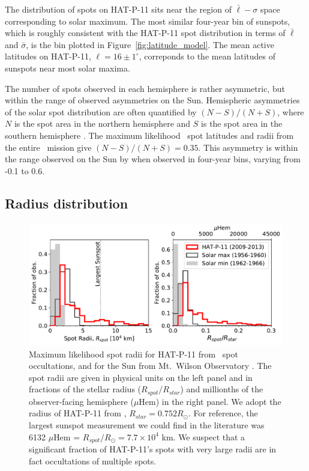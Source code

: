 The distribution of spots on HAT-P-11 sits near the region of $\bar{\ell} - \sigma$ space corresponding to solar maximum. The most similar four-year bin of sunspots, which is roughly consistent with the HAT-P-11 spot distribution in terms of $\bar{\ell}$ and $\bar{\sigma}$, is the bin plotted in Figure~\ref{fig:latitude_model}. The mean active latitudes on HAT-P-11, $\ell = 16 \pm 1^\circ$, correponds to the mean latitudes of sunspots near most solar maxima.

The number of spots observed in each hemisphere is rather asymmetric, but within the range of observed asymmetries on the Sun. Hemispheric asymmetries of the solar spot distribution are often quantified by $(N-S)/(N+S)$, where $N$ is the spot area in the northern hemisphere and $S$ is the spot area in the southern hemisphere \citep{Waldmeier1971, Carbonell1993}. The maximum likelihood \stsp\ spot latitudes and radii from the entire \kepler\ mission give $(N-S)/(N+S)=0.35$. This asymmetry is within the range observed on the Sun by \citet{Howard1984} when observed in four-year bins, varying from -0.1 to 0.6.

\subsection{Radius distribution} \label{sec:radii}

\begin{figure}
\centering
\includegraphics[scale=0.75]{stsp_hat_p_11/spot_radii.pdf}
\caption{Maximum likelihood spot radii for HAT-P-11 from \kepler\ spot occultations, and for the Sun from Mt.~Wilson Observatory \citep{Howard1984}. The spot radii are given in physical units on the left panel and in fractions of the stellar radius ($R_{spot}/R_{star}$) and millionths of the observer-facing hemisphere ($\mu$Hem) in the right panel. We adopt the radius of HAT-P-11 from \citet{Bakos2010}, $R_{star} = 0.752 R_\odot$. For reference, the largest sunspot measurement we could find in the literature was 6132 $\mu$Hem = $R_{spot} / R_{\odot} = 7.7 \times 10^4$ km. We suspect that a significant fraction of HAT-P-11's spots with very large radii are in fact occultations of multiple spots.}
\label{fig:radii}
\end{figure}

